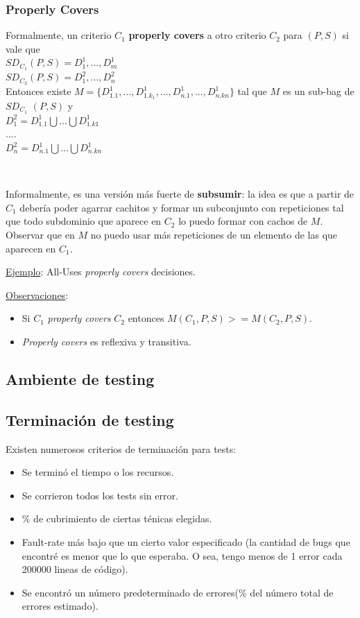 \documentclass[]{article}
\begin{document}
\subsubsection{Properly Covers}
Formalmente, un criterio $C_1$ \textbf{properly covers} a otro criterio $C_2$ para $(P,S)$ si vale que\\
$SD_{C_1} (P,S) = {D_1^1,..., D_m^1}$\\
$SD_{C_2} (P,S) = {D_1^2,..., D_n^2}$\\

Entonces existe $M = \{D_{1.1}^1,..., D_{1.k_1}^1 ,...,D_{n.1}^1,..., D_{n.kn}^1\}$ tal que $M$ es un sub-bag de $SD_{C_1}$ $(P,S)$ y\\
$D_1^2 = D_{1.1}^1 \bigcup ... \bigcup D_{1.k1}^1$\\
....\\
$D_n^2 = D_{n.1}^1 \bigcup ... \bigcup D_{n.kn}^1$

~\newline

Informalmente, es una versión más fuerte de \textbf{subsumir}: la idea es que a partir de $C_1$ debería poder agarrar cachitos y formar un subconjunto con repeticiones tal que todo subdominio que aparece en $C_2$ lo puedo formar con cachos de $M$. Observar que en $M$ no puedo usar más repeticiones de un elemento de las que aparecen en $C_1$.
~\newline

\underline{Ejemplo}: All-Uses \textit{properly covers} decisiones.
~\newline

\underline{Observaciones}:
\begin{itemize}
	\item Si $C_1$ \textit{properly covers} $C_2$ entonces $M(C_1, P, S) >= M (C_2, P,S)$.
	\item \textit{Properly covers} es reflexiva y transitiva.
\end{itemize}

\subsection{Ambiente de testing}

\subsection{Terminación de testing}
Existen numerosos criterios de terminación para tests:
\begin{itemize}
	\item Se terminó el tiempo o los recursos.
	\item Se corrieron todos los tests sin error.
	\item \% de cubrimiento de ciertas ténicas elegidas.
	\item Fault-rate más bajo que un cierto valor especificado (la cantidad de bugs que encontré es menor que lo que esperaba. O sea, tengo menos de 1 error cada 200000 lineas de código).
	\item Se encontró un número predeterminado de errores(\% del número total de errores estimado).
\end{itemize}
\end{document}
